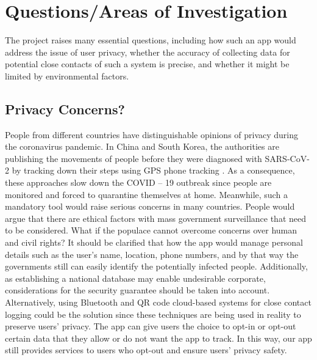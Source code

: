 \section{Questions/Areas of Investigation}
  \par The project raises many essential questions, including how such an app would address the issue of user privacy, whether the accuracy of collecting data for potential close contacts of such a system is precise, and whether it might be limited by environmental factors.

  \subsection{Privacy Concerns?}
    \par People from different countries have distinguishable opinions of privacy during the coronavirus pandemic. In China and South Korea, the authorities are publishing the movements of people before they were diagnosed with SARS-CoV-2 by tracking down their steps using GPS phone tracking \parencite{SingTraceTogether}. As a consequence, these approaches slow down the COVID – 19 outbreak since people are monitored and forced to quarantine themselves at home. Meanwhile, such a mandatory tool would raise serious concerns in many countries. People would argue that there are ethical factors with mass government surveillance that need to be considered. What if the populace cannot overcome concerns over human and civil rights? It should be clarified that how the app would manage personal details such as the user’s name, location, phone numbers, and by that way the governments still can easily identify the potentially infected people. Additionally, as establishing a national database may enable undesirable corporate, considerations for the security guarantee should be taken into account. Alternatively, using Bluetooth and QR code cloud-based systems for close contact logging could be the solution since these techniques are being used in reality to preserve users’ privacy. The app can give users the choice to opt-in or opt-out certain data that they allow or do not want the app to track. In this way, our app still provides services to users who opt-out and ensure users’ privacy safety.

